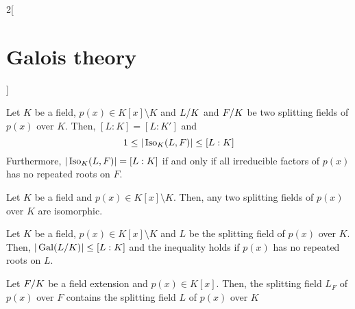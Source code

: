 \documentclass[../../../main.tex]{subfiles}
\begin{document}
\begin{multicols}{2}[\section{Galois theory}]
\begin{theorem}
  \end{theorem}
  \begin{theorem}
    Let $K$ be a field, $p(x)\in K[x]\setminus K$ and $\quot{L}{K}$ and $\quot{F}{K}$ be two splitting fields of $p(x)$ over $K$. Then, $[L:K]=[L:K']$ and $$1\leq|\operatorname{Iso}_K(L,F)|\leq [L:K]$$ Furthermore, $|\operatorname{Iso}_K(L,F)|=[L:K]$ if and only if all irreducible factors of $p(x)$ has no repeated roots on $F$.
  \end{theorem}
  \begin{corollary}
    Let $K$ be a field and $p(x)\in K[x]\setminus K$. Then, any two splitting fields of $p(x)$ over $K$ are isomorphic.
  \end{corollary}
  \begin{corollary}
    Let $K$ be a field, $p(x)\in K[x]\setminus K$ and $L$ be the splitting field of $p(x)$ over $K$. Then, $|\Gal(\quot{L}{K})|\leq[L:K]$ and the inequality holds if $p(x)$ has no repeated roots on $L$.
  \end{corollary}
  \begin{corollary}
    Let $\quot{F}{K}$ be a field extension and $p(x)\in K[x]$. Then, the splitting field $L_F$ of $p(x)$ over $F$ contains the splitting field $L$ of $p(x)$ over $K$
  \end{corollary}
\end{multicols}
\end{document}
